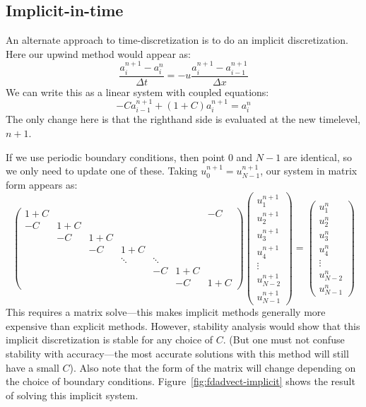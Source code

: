 \subsection{Implicit-in-time}

An alternate approach to time-discretization is to do an implicit
discretization.  Here our upwind method would appear as:
\begin{equation}
\frac{a^{n+1}_i - a^n_i}{\Delta t} = -u \frac{a^{n+1}_i - a^{n+1}_{i-1}}{\Delta x}
\end{equation}
We can write this as a linear system with coupled equations:
\begin{equation}
-C a^{n+1}_{i-1} + (1 + C) a^{n+1}_i = a_i^n
\end{equation}
The only change here is that the righthand side is evaluated at the new timelevel,
$n+1$.

If we use periodic boundary conditions, then point $0$ and $N-1$ are
identical, so we only need to update one of these.  Taking $u_0^{n+1} = u_{N-1}^{n+1}$, our system in matrix form appears as:
\begin{equation}
\renewcommand{\arraystretch}{1.5}
\left ( \begin{array}{ccccccc} 
1+C & & & & & & -C \\
-C  & 1+C &  \\
 &  -C & 1+C &  \\
 & & -C & 1+C &  \\
&&&\ddots&\ddots &\\
&&&&-C & 1+C & \\
&&&&& -C &1+C
\end{array}
\right )
%
\left ( \begin{array}{c}
u_1^{n+1} \\
u_2^{n+1} \\
u_3^{n+1} \\
u_4^{n+1} \\
\vdots \\
u_{N-2}^{n+1} \\
u_{N-1}^{n+1} 
\end{array}
\right )
=
\left ( \begin{array}{c}
u_1^{n} \\
u_2^{n} \\
u_3^{n} \\
u_4^{n} \\
\vdots \\
u_{N-2}^{n} \\
u_{N-1}^{n} 
\end{array}
\right )
\end{equation}
This requires a matrix solve---this makes implicit methods generally more
expensive than explicit methods.  However, stability analysis would show
that this implicit discretization is stable for any choice of $C$. (But
one must not confuse stability with accuracy---the most accurate solutions
with this method will still have a small $C$).  Also note that the form of 
the matrix will change depending on the choice of boundary conditions.
Figure~\ref{fig:fdadvect-implicit} shows the result of solving this
implicit system.

